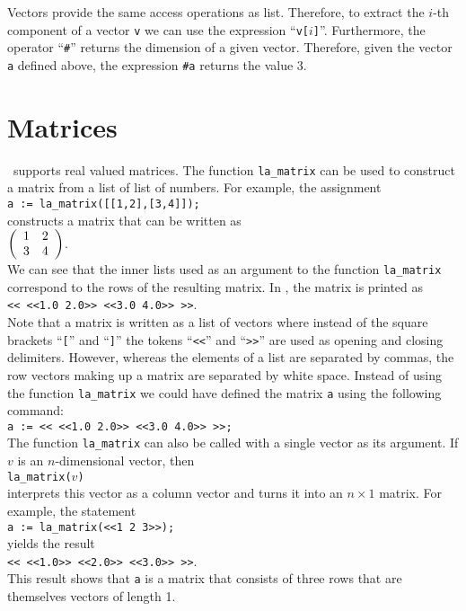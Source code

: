 Vectors provide the same access operations as list.  Therefore, to extract the $i$-th component of a
vector \texttt{v} we can use the expression ``\texttt{v[$i$]}''.  Furthermore, the operator
``\texttt{\#}'' returns the dimension of a given vector.  Therefore, given the vector \texttt{a}
defined above, the expression \texttt{\#a} returns the value 3.


\section{Matrices}
\setlx\ supports real valued matrices.  The function \texttt{la\_matrix} can be used to construct a
matrix from a list of list of numbers.  For example, the assignment
\\[0.2cm]
\hspace*{1.3cm}
\texttt{a := la\_matrix([[1,2],[3,4]]);}
\\[0.2cm]
constructs a matrix that can be written as
\\[0.2cm]
\hspace*{1.3cm}
$
\left(
\begin{array}[c]{ll}
  1 & 2 \\
  3 & 4
\end{array}
\right)
$.
\\[0.2cm]
We can see that the inner lists used as an argument to the function \texttt{la\_matrix} correspond
to the rows of the resulting matrix.   In \setlx, the matrix is printed as
\\[0.2cm]
\hspace*{1.3cm}
\texttt{<< <<1.0 2.0>> <<3.0 4.0>> >>}.
\\[0.2cm]
Note that a matrix is written as a list of vectors where instead of the square brackets
``\texttt{[}'' and ``\texttt{]}''  the tokens ``\texttt{<<}'' and
``\texttt{>>}'' are used as opening and closing delimiters.  However, whereas the elements of a list
are separated by commas, the row vectors making up a matrix are separated by white space.  
Instead of using the function \texttt{la\_matrix} we could have defined the matrix \texttt{a} using
the following command:
\\[0.2cm]
\hspace*{1.3cm}
\texttt{a := << <<1.0 2.0>> <<3.0 4.0>> >>;}
\\[0.2cm]  
The function \texttt{la\_matrix} can also be called with a single vector as its argument.  If $v$ is an
$n$-dimensional vector, then 
\\[0.2cm]
\hspace*{1.3cm}
\texttt{la\_matrix($v$)}
\\[0.2cm]
interprets this vector as a column vector and turns it into an $n \times 1$ matrix.  For example, 
the statement 
\\[0.2cm]
\hspace*{1.3cm}
\texttt{a := la\_matrix(<<1 2 3>>);}
\\[0.2cm]
yields the result
\\[0.2cm]
\hspace*{1.3cm}
\texttt{<< <<1.0>> <<2.0>> <<3.0>> >>}.
\\[0.2cm]
This result shows that \texttt{a} is a matrix that consists of three rows that are themselves
vectors of length 1.

